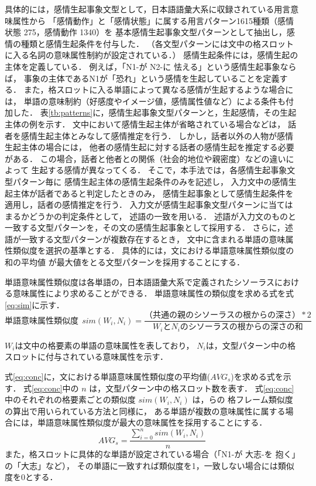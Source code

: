 \documentclass[japanese]{jnlp_1.3c}
\begin{document}
具体的には，感情生起事象文型として，日本語語彙大系\cite{jlexicon}に収録されている用言意味属性から
「感情動作」と「感情状態」に属する用言パターン1615種類（感情状態 275，感情動作 1340）を
基本感情生起事象文型パターンとして抽出し，感情の種類と感情生起条件を付与した．
（各文型パターンには文中の格スロットに入る名詞の意味属性制約が設定されている．）
感情生起条件には，感情生起の主体を定義している．
例えば，「N1-が N2-に 怯える」という感情生起事象ならば，
事象の主体であるN1が「恐れ」という感情を生起していることを定義する．
また，格スロットに入る単語によって異なる感情が生起するような場合には，
単語の意味制約（好感度やイメージ値，感情属性値など）による条件も付加した．
表\ref{tb:patterns}に，感情生起事象文型パターンと，生起感情，その生起主体の例を示す．
文中において感情生起主体が省略されている場合などは，
話者を感情生起主体とみなして感情推定を行う．
しかし，話者以外の人物が感情生起主体の場合には，
他者の感情生起に対する話者の感情生起を推定する必要がある．
この場合，話者と他者との関係（社会的地位や親密度）などの違いによって
生起する感情が異なってくる．
そこで，本手法では，各感情生起事象文型パターン毎に
感情生起主体の感情生起条件のみを記述し，
入力文中の感情生起主体が話者であると判定したときのみ，
感情生起事象として感情生起条件を適用し，話者の感情推定を行う．
入力文が感情生起事象文型パターンに当てはまるかどうかの判定条件として，
述語の一致を用いる．
述語が入力文のものと一致する文型パターンを，その文の感情生起事象として採用する．
さらに，述語が一致する文型パターンが複数存在するとき，
文中に含まれる単語の意味属性類似度を選択の基準とする．
具体的には，文における単語意味属性類似度の和の平均値
が最大値をとる文型パターンを採用することにする．

単語意味属性類似度は各単語の，日本語語彙大系で定義されたシソーラスにおける意味属性により求めることができる．
単語意味属性の類似度を求める式を式\ref{eq:sim}に示す．
\begin{equation}\label{eq:sim}
単語意味属性類似度 \ \ sim(W_i, N_i) = \frac{（共通の親のシソーラスの根からの深さ）*2}{W_iとN_iのシソーラスの根からの深さの和} 
\end{equation}

$W_i$は文中の格要素の単語の意味属性を表しており，
$N_i$は，文型パターン中の格スロットに付与されている意味属性を示す．

式\ref{eq:conc}に，文における単語意味属性類似度の平均値($AVG_s$)を求める式を示す．
式\ref{eq:conc}中の $n$ は，文型パターン中の格スロット数を表す．
式\ref{eq:conc}中のそれぞれの格要素ごとの類似度 $sim(W_i, N_i)$ は，\cite{Kawahara}らの
格フレーム類似度の算出で用いられている方法と同様に，
ある単語が複数の意味属性に属する場合には，単語意味属性類似度が最大の意味属性を採用することにする．
\begin{equation}\label{eq:conc}
AVG_s = \frac{ \sum^{n}_{i=0} sim(W_i, N_i) }{ n }
\end{equation}
また，格スロットに具体的な単語が設定されている場合（「N1-が 大志-を 抱く」の「大志」など），
その単語に一致すれば類似度を1，一致しない場合には類似度を0とする．
\end{document}
